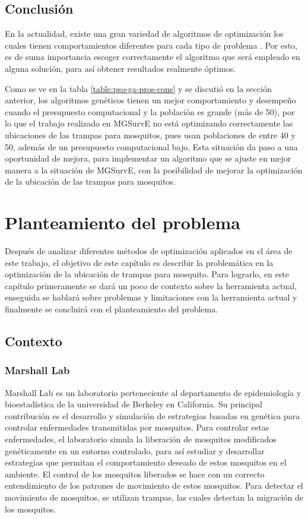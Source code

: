 \documentclass[letterpaper]{report}
\begin{document}
\section{Conclusión}
  En la actualidad, existe una gran variedad de algoritmos de optimización los
  cuales tienen comportamientos diferentes para cada tipo de problema
  \cite{SwarmVsEvol}. Por esto, es de suma importancia escoger correctamente el
  algoritmo que será empleado en alguna solución, para así obtener resultados
  realmente óptimos.

  Como se ve en la tabla \ref{table:pso-ga-pros-cons} y se discutió en la
  sección anterior, los algoritmos genéticos tienen un mejor comportamiento y
  desempeño cuando el presupuesto computacional y la población es grande
  (más de 50), por lo que el trabajo realizado en MGSurvE \cite{MGSurvE} no
  está optimizando correctamente las ubicaciones de las trampas para mosquitos,
  pues usan poblaciones de entre 40 y 50, además de un presupuesto computacional
  bajo. Esta situación da paso a una oportunidad de mejora, para implementar un
  algoritmo que se ajuste en mejor manera a la situación de MGSurvE, con la
  posibilidad de mejorar la optimización de la ubicación de las trampas para
  mosquitos.

\chapter{Planteamiento del problema}
  Después de analizar diferentes métodos de optimización aplicados en el área de
  este trabajo, el objetivo de este capítulo es describir la problemática en
  la optimización de la ubicación de trampas para mosquito. Para lograrlo, en
  este 
  capítulo primeramente se dará un poco de contexto sobre la herramienta actual,
  enseguida se hablará sobre problemas y limitaciones con la herramienta actual
  y finalmente se concluirá con el planteamiento del problema.

  \section{Contexto}
    \subsection{Marshall Lab}
    Marshall Lab \cite{MarshallLab} es un laboratorio perteneciente al
    departamento de epidemiología y bioestadística de la universidad de Berkeley
    en California. Su principal contribución es el desarrollo y simulación de
    estrategias basadas en genética para controlar enfermedades transmitidas por
    mosquitos. Para controlar estas enfermedades, el laboratorio simula la
    liberación de mosquitos modificados genéticamente en un entorno controlado,
    para así estudiar y desarrollar estrategias que permitan el comportamiento
    deseado de estos mosquitos en el ambiente. El control de los mosquitos
    liberados se hace con un correcto entendimiento de los patrones de
    movimiento de estos mosquitos. Para detectar el movimiento de mosquitos, se
    utilizan trampas, las cuales detectan la migración de los mosquitos.
\end{document}
